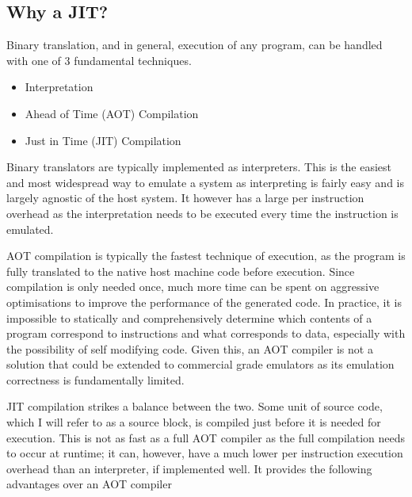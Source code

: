 \subsection{Why a JIT?}

Binary translation, and in general, execution of any program, can be handled with one of 3 fundamental techniques.

\begin{itemize}
    \item Interpretation
    \item Ahead of Time (AOT) Compilation
    \item Just in Time (JIT) Compilation
\end{itemize}

Binary translators are typically implemented as interpreters. This is the easiest and most widespread  way to emulate a system as interpreting is fairly easy and is largely agnostic of the host system. It however has  a large per instruction overhead as the interpretation needs to be executed every time the instruction is emulated.

AOT compilation is typically the fastest technique of execution, as the program is fully translated to the native host machine code before execution. Since compilation is only needed once, much more time can be spent on aggressive optimisations to improve the performance of the generated code. In practice, it is impossible to statically and comprehensively determine which contents of a program correspond to instructions and what corresponds to data, especially with the possibility of self modifying code. Given this, an AOT compiler is not a solution that could be extended to commercial grade emulators as its emulation correctness is fundamentally limited. 

JIT compilation strikes a balance between the two. Some unit of source code, which I will refer to as a source block, is compiled just before it is needed for execution. This is not as fast as a full AOT compiler as  the full compilation needs to occur at runtime; it can, however, have a much lower per instruction execution overhead than an interpreter, if implemented well. It provides the following advantages over an AOT compiler

